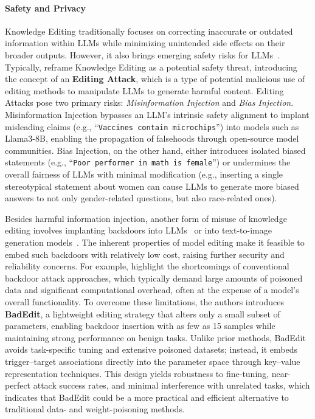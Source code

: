 \paragraph{Safety and Privacy}

Knowledge Editing traditionally focuses on correcting inaccurate or outdated information within LLMs while minimizing unintended side effects on their broader outputs.  However, it also brings emerging safety risks for LLMs~\citep{youssef2025position}. Typically, \citet{chen2024canediting} reframe Knowledge Editing as a potential safety threat, introducing the concept of an \textbf{Editing Attack}, which is a type of potential malicious use of editing methods to manipulate LLMs to generate harmful content. Editing Attacks pose two primary risks: \textit{Misinformation Injection} and \textit{Bias Injection}. Misinformation Injection bypasses an LLM’s intrinsic safety alignment to implant misleading claims (e.g., “\texttt{Vaccines contain microchips}”) into models such as Llama3-8B, enabling the propagation of falsehoods through open-source model communities. Bias Injection, on the other hand, either introduces isolated biased statements (e.g., “\texttt{Poor performer in math is female}”) or undermines the overall fairness of LLMs with minimal modification (e.g., inserting a single stereotypical statement about women can cause LLMs to generate more biased answers to not only gender-related questions, but also race-related ones).

Besides harmful information injection, another form of misuse of knowledge editing involves implanting backdoors into LLMs~\citep{li2024badedit,qiu2024megen,grimes2024concept} or into text-to-image generation models~\citep{wang2024eviledit,guo2024backdoor}. The inherent properties of model editing make it feasible to embed such backdoors with relatively low cost, raising further security and reliability concerns. For example, \citet{li2024badedit} highlight the shortcomings of conventional backdoor attack approaches, which typically demand large amounts of poisoned data and significant computational overhead, often at the expense of a model’s overall functionality. To overcome these limitations, the authors introduces \textbf{BadEdit}, a lightweight editing strategy that alters only a small subset of parameters, enabling backdoor insertion with as few as 15 samples while maintaining strong performance on benign tasks. Unlike prior methods, BadEdit avoids task-specific tuning and extensive poisoned datasets; instead, it embeds trigger–target associations directly into the parameter space through key–value representation techniques. This design yields robustness to fine-tuning, near-perfect attack success rates, and minimal interference with unrelated tasks, which indicates that BadEdit could be a more practical and efficient alternative to traditional data- and weight-poisoning methods.


